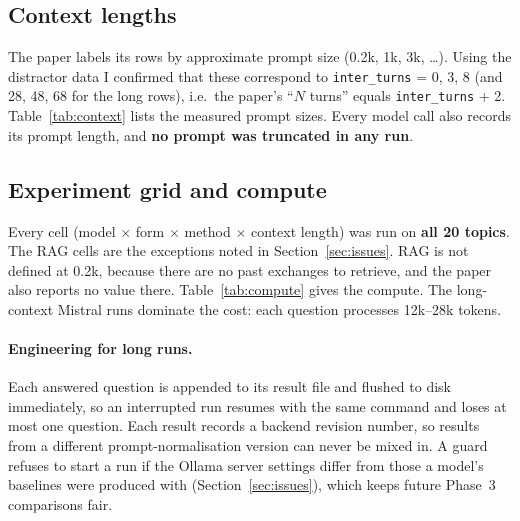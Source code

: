 \documentclass[11pt,a4paper]{article}
\begin{document}
\subsection{Context lengths}
The paper labels its rows by approximate prompt size (0.2k, 1k, 3k, \dots). Using the distractor data I confirmed that
these correspond to \texttt{inter\_turns} = 0, 3, 8 (and 28, 48, 68 for the long rows), i.e.\ the paper's ``$N$ turns''
equals \texttt{inter\_turns} + 2. Table~\ref{tab:context} lists the measured prompt sizes. Every model call also records its
prompt length, and \textbf{no prompt was truncated in any run}.

\begin{table}[H]
\centering\small

\caption{Mapping between the paper's context rows and \texttt{inter\_turns}, with the measured mean prompt length of
the final zero-shot call (in each model's own tokens; Mistral's tokenizer produces $\approx$10--25\% more tokens).}
\label{tab:context}
\end{table}

\subsection{Experiment grid and compute}
Every cell (model $\times$ form $\times$ method $\times$ context length) was run on \textbf{all 20 topics}. The RAG cells are
the exceptions noted in Section~\ref{sec:issues}. RAG is not defined at 0.2k, because there are no past exchanges to retrieve, and the
paper also reports no value there. Table~\ref{tab:compute} gives the compute. The long-context Mistral runs dominate the cost:
each question processes 12k--28k tokens.

\begin{table}[H]
\centering\small

\caption{Questions answered and GPU time per group of runs, taken from the run manifest. ``Questions'' counts model
evaluations performed. The final results contain \nQuestions{} questions in \nCells{} complete cells.}
\label{tab:compute}
\end{table}

\paragraph{Engineering for long runs.} Each answered question is appended to its result file and flushed to disk
immediately, so an interrupted run resumes with the same command and loses at most one question. Each result records a
backend revision number, so results from a different prompt-normalisation version can never be mixed in. A guard refuses to
start a run if the Ollama server settings differ from those a model's baselines were produced with
(Section~\ref{sec:issues}), which keeps future Phase~3 comparisons fair.
\end{document}
